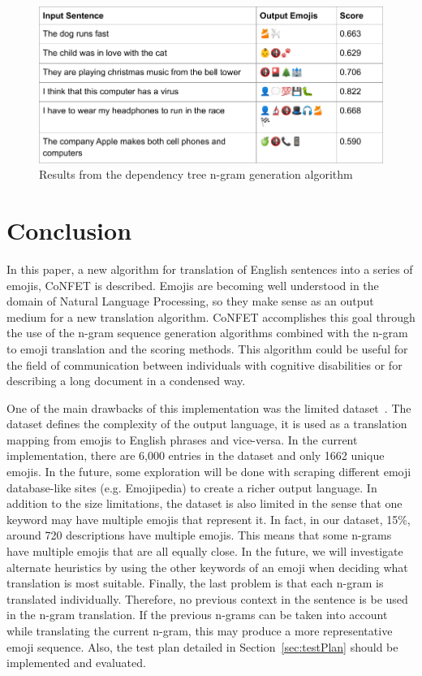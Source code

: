\documentclass{article}[10]
\begin{document}
\begin{figure}[H]
  \begin{center}
    \includegraphics[width=\columnwidth]{figures/dependency.png}
      \caption{Results from the dependency tree n-gram generation algorithm\label{fig:dependency}}
  \end{center}
\end{figure}

\section{Conclusion}

In this paper, a new algorithm for translation of English sentences
into a series of emojis, CoNFET is described. Emojis are becoming well
understood in the domain of Natural Language Processing, so they make
sense as an output medium for a new translation algorithm. CoNFET
accomplishes this goal through the use of the n-gram sequence generation
algorithms combined with the n-gram to emoji translation and the scoring
methods. This algorithm could be useful for the field of communication
between individuals with cognitive disabilities or for describing a long
document in a condensed way.

One of the main drawbacks of this implementation was the
limited dataset~\cite{Eisner_2016}. The dataset defines the complexity of the output
language, it is used as a translation mapping from emojis to English
phrases and vice-versa. In the current implementation, there are 6,000
entries in the dataset and only 1662 unique emojis. In the future, some
exploration will be done with scraping different emoji database-like
sites (e.g. Emojipedia) to create a richer output language. In addition
to the size limitations, the dataset is also limited in the sense that
one keyword may have multiple emojis that represent it. In fact, in our
dataset, 15\%, around 720 descriptions have multiple emojis. This means
that some n-grams have multiple emojis that are all equally close. In
the future, we will investigate alternate heuristics by using the other
keywords of an emoji when deciding what translation is most suitable.
Finally, the last problem is that each n-gram is translated
individually. Therefore, no previous context in the sentence is be used
in the n-gram translation. If the previous n-grams can be taken into
account while translating the current n-gram, this may produce a more
representative emoji sequence. Also, the test plan detailed in
Section~\ref{sec:testPlan} should be implemented and
evaluated.

\makeatother


\end{document}
